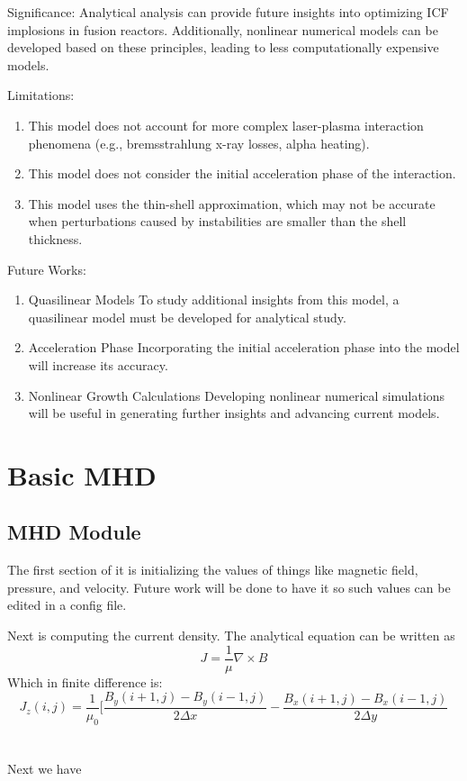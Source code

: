 \par Significance:
Analytical analysis can provide future insights into optimizing ICF implosions in fusion reactors. Additionally, nonlinear numerical models can be developed based on these principles, leading to less computationally expensive models.

\par Limitations:
\begin{enumerate}
    \item This model does not account for more complex laser-plasma interaction phenomena (e.g., bremsstrahlung x-ray losses, alpha heating).
    \item This model does not consider the initial acceleration phase of the interaction.
    \item This model uses the thin-shell approximation, which may not be accurate when perturbations caused by instabilities are smaller than the shell thickness.
\end{enumerate}

\par Future Works:
\begin{enumerate}
    \item Quasilinear Models
To study additional insights from this model, a quasilinear model must be developed for analytical study.

    \item Acceleration Phase
Incorporating the initial acceleration phase into the model will increase its accuracy.

    \item Nonlinear Growth Calculations
Developing nonlinear numerical simulations will be useful in generating further insights and advancing current models.
\end{enumerate}

\section{Basic MHD}
\subsection{MHD Module}
\par The first section of it is initializing the values of things like magnetic field, pressure, and velocity. Future work will be done to have it so such values can be edited in a config file.
\par Next is computing the current density. The analytical equation can be written as 
$$J =\frac{1}{\mu} \nabla \times B$$
Which in finite difference is:
$$J_z(i,j)=\frac{1}{\mu_0}[\frac{B_y(i+1,j)-B_y(i-1,j)}{2\Delta x}-\frac{B_x(i+1,j)-B_x(i-1,j)}{2\Delta y}$$
\\
\\
Next we have
\\
\\

